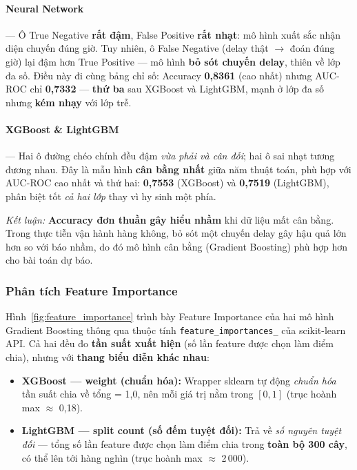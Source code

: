 \paragraph{Neural Network}
--- Ô True Negative \textbf{rất đậm},
False Positive \textbf{rất nhạt}: mô hình xuất sắc nhận diện chuyến đúng giờ.
Tuy nhiên, ô False Negative (delay thật $\rightarrow$ đoán đúng giờ)
lại đậm hơn True Positive --- mô hình \textbf{bỏ sót chuyến delay},
thiên về lớp đa số.
Điều này đi cùng bảng chỉ số: Accuracy \textbf{0,8361} (cao nhất) nhưng
AUC-ROC chỉ \textbf{0,7332} --- \textbf{thứ ba} sau XGBoost và LightGBM, mạnh ở lớp đa số nhưng \textbf{kém nhạy} với lớp trễ.

\paragraph{XGBoost \& LightGBM}
--- Hai ô đường chéo chính đều đậm \textit{vừa phải và cân đối};
hai ô sai nhạt tương đương nhau.
Đây là mẫu hình \textbf{cân bằng nhất} giữa năm thuật toán,
phù hợp với AUC-ROC cao nhất và thứ hai:
\textbf{0,7553} (XGBoost) và \textbf{0,7519} (LightGBM), phân biệt tốt \textit{cả hai lớp} thay vì hy sinh một phía.

\medskip
\noindent\textit{Kết luận:} \textbf{Accuracy đơn thuần gây hiểu nhầm} khi dữ liệu mất cân bằng.
Trong thực tiễn vận hành hàng không, bỏ sót một chuyến delay
gây hậu quả lớn hơn so với báo nhầm, do đó mô hình cân bằng
(Gradient Boosting) phù hợp hơn cho bài toán dự báo.

\subsubsection{Phân tích Feature Importance}

Hình~\ref{fig:feature_importance} trình bày Feature Importance
của hai mô hình Gradient Boosting thông qua thuộc tính
\texttt{feature\_importances\_} của scikit-learn API.
Cả hai đều đo \textbf{tần suất xuất hiện} (số lần feature được chọn làm điểm chia),
nhưng với \textbf{thang biểu diễn khác nhau}:

\begin{itemize}
    \item \textbf{XGBoost --- weight (chuẩn hóa):}
          Wrapper sklearn tự động \textit{chuẩn hóa} tần suất chia về tổng = 1{,}0,
          nên mỗi giá trị nằm trong $[0, 1]$ (trục hoành max $\approx$ 0{,}18).

    \item \textbf{LightGBM --- split count (số đếm tuyệt đối):}
          Trả về \textit{số nguyên tuyệt đối} --- tổng số lần feature được chọn
          làm điểm chia trong \textbf{toàn bộ 300 cây},
          có thể lên tới hàng nghìn (trục hoành max $\approx$ 2\,000).
\end{itemize}

